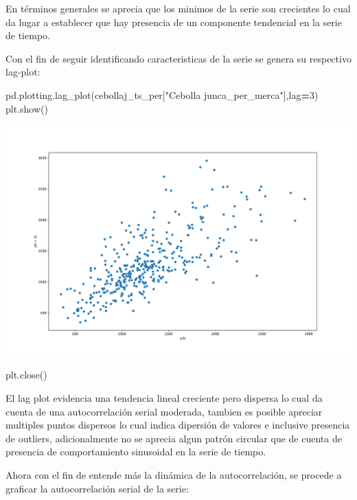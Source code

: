 \documentclass[
]{book}
\newenvironment{Shaded}{\begin{snugshade}}{\end{snugshade}}
\newcommand{\DecValTok}[1]{\textcolor[rgb]{0.00,0.00,0.81}{#1}}
\newcommand{\NormalTok}[1]{#1}
\newcommand{\OperatorTok}[1]{\textcolor[rgb]{0.81,0.36,0.00}{\textbf{#1}}}
\newcommand{\StringTok}[1]{\textcolor[rgb]{0.31,0.60,0.02}{#1}}
\begin{document}
En términos generales se aprecia que los minimos de la serie son crecientes lo cual da lugar a establecer que hay presencia de un componente tendencial en la serie de tiempo.

Con el fin de seguir identificando caracteristicas de la serie se genera su respectivo lag-plot:

\begin{Shaded}
\begin{Highlighting}[]
\NormalTok{pd.plotting.lag\_plot(cebollaj\_ts\_per[}\StringTok{"Cebolla junca\_per\_merca"}\NormalTok{],lag}\OperatorTok{=}\DecValTok{3}\NormalTok{)}
\NormalTok{plt.show()}
\end{Highlighting}
\end{Shaded}

\includegraphics{bookdown-demo_files/figure-latex/unnamed-chunk-96-73.pdf}

\begin{Shaded}
\begin{Highlighting}[]
\NormalTok{plt.close()}
\end{Highlighting}
\end{Shaded}

El lag plot evidencia una tendencia lineal creciente pero dispersa lo cual da cuenta de una autocorrelación serial moderada, tambien es posible apreciar multiples puntos dispersos lo cual indica dipersión de valores e inclusive presencia de outliers, adicionalmente no se aprecia algun patrón circular que de cuenta de presencia de comportamiento sinusoidal en la serie de tiempo.

Ahora con el fin de entende más la dinámica de la autocorrelación, se procede a graficar la autocorrelación serial de la serie:
\end{document}
